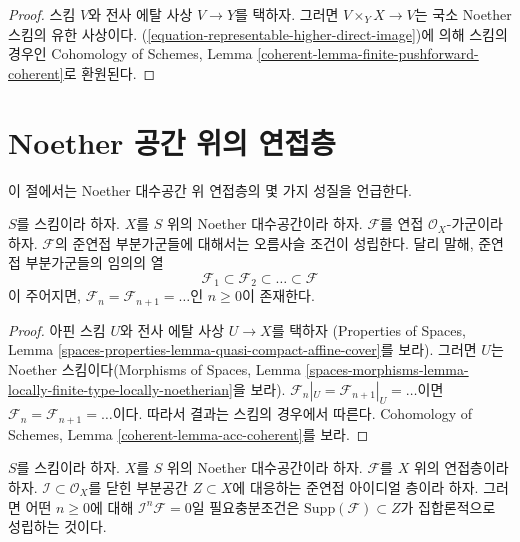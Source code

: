 \begin{proof}
스킴 $V$와 전사 에탈 사상 $V \to Y$를 택하자. 그러면
$V \times_Y X \to V$는 국소 Noether 스킴의 유한 사상이다.
(\ref{equation-representable-higher-direct-image})에 의해 스킴의 경우인
Cohomology of Schemes, Lemma
\ref{coherent-lemma-finite-pushforward-coherent}로 환원된다.
\end{proof}






\section{Noether 공간 위의 연접층}
\label{section-coherent-quasi-compact}

\noindent
이 절에서는 Noether 대수공간 위 연접층의 몇 가지 성질을 언급한다.

\begin{lemma}
\label{lemma-acc-coherent}
$S$를 스킴이라 하자. $X$를 $S$ 위의 Noether 대수공간이라 하자.
$\mathcal{F}$를 연접 $\mathcal{O}_X$-가군이라 하자.
$\mathcal{F}$의 준연접 부분가군들에 대해서는 오름사슬 조건이 성립한다.
달리 말해, 준연접 부분가군들의 임의의 열
$$
\mathcal{F}_1 \subset \mathcal{F}_2 \subset \ldots \subset \mathcal{F}
$$
이 주어지면, $\mathcal{F}_n = \mathcal{F}_{n + 1} = \ldots $인
$n \geq 0$이 존재한다.
\end{lemma}

\begin{proof}
아핀 스킴 $U$와 전사 에탈 사상 $U \to X$를 택하자
(Properties of Spaces, Lemma
\ref{spaces-properties-lemma-quasi-compact-affine-cover}를 보라).
그러면 $U$는 Noether 스킴이다(Morphisms of Spaces, Lemma
\ref{spaces-morphisms-lemma-locally-finite-type-locally-noetherian}을 보라).
$\mathcal{F}_n|_U = \mathcal{F}_{n + 1}|_U = \ldots$이면
$\mathcal{F}_n = \mathcal{F}_{n + 1} = \ldots$이다.
따라서 결과는 스킴의 경우에서 따른다. Cohomology of Schemes, Lemma
\ref{coherent-lemma-acc-coherent}를 보라.
\end{proof}

\begin{lemma}
\label{lemma-power-ideal-kills-sheaf}
$S$를 스킴이라 하자. $X$를 $S$ 위의 Noether 대수공간이라 하자.
$\mathcal{F}$를 $X$ 위의 연접층이라 하자.
$\mathcal{I} \subset \mathcal{O}_X$를 닫힌 부분공간 $Z \subset X$에
대응하는 준연접 아이디얼 층이라 하자. 그러면 어떤 $n \geq 0$에 대해
$\mathcal{I}^n\mathcal{F} = 0$일 필요충분조건은
$\text{Supp}(\mathcal{F}) \subset Z$가 집합론적으로 성립하는 것이다.
\end{lemma}


